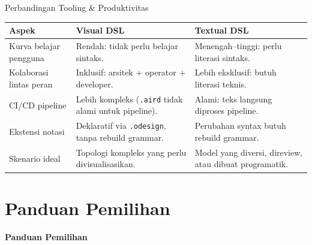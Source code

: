 \documentclass[aspectratio=169, table]{beamer}
\begin{document}
\begin{frame}{Perbandingan Tooling \& Produktivitas}
\vspace{4pt}
\centering
\scriptsize
\begin{tabular}{|>{\raggedright\arraybackslash}p{}|>{\raggedright\arraybackslash}p{}|>{\raggedright\arraybackslash}p{}|}
\hline
\rowcolor{blue!12}
\textbf{Aspek} & \textbf{Visual DSL} & \textbf{Textual DSL} \\
\hline
Kurva belajar pengguna & Rendah: tidak perlu belajar sintaks. & Menengah--tinggi: perlu literasi sintaks. \\
\hline
Kolaborasi lintas peran & Inklusif: arsitek + operator + developer. & Lebih eksklusif: butuh literasi teknis. \\
\hline
CI/CD pipeline & Lebih kompleks (\texttt{.aird} tidak alami untuk pipeline). & Alami: teks langsung diproses pipeline. \\
\hline
Ekstensi notasi & Deklaratif via \texttt{.odesign}, tanpa rebuild grammar. & Perubahan syntax butuh rebuild grammar. \\
\hline
Skenario ideal & Topologi kompleks yang perlu divisualisasikan. & Model yang diversi, direview, atau dibuat programatik. \\
\hline
\end{tabular}
\end{frame}

\section{Panduan Pemilihan}
\begin{frame}{\hfill}
	\centering
	\Huge{\textbf{Panduan Pemilihan}}
\end{frame}
\end{document}
